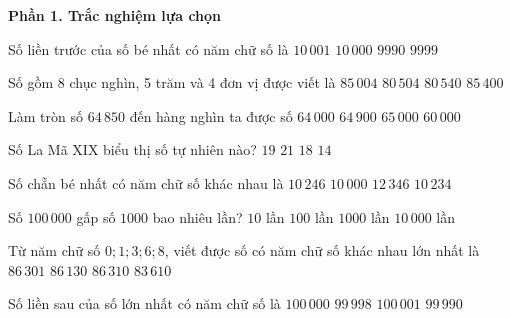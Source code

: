 \textbf{Phần 1. Trắc nghiệm lựa chọn}

\begin{ex} %
Số liền trước của số bé nhất có năm chữ số là
\choice
{$10\,001$}
{$10\,000$}
{$9990$}
{\True $9999$}
\end{ex}

\begin{ex} %
Số gồm 8 chục nghìn, 5 trăm và 4 đơn vị được viết là
\choice
{$85\,004$}
{\True $80\,504$}
{$80\,540$}
{$85\,400$}
\end{ex}

\begin{ex} %
Làm tròn số $64\,850$ đến hàng nghìn ta được số
\choice
{$64\,000$}
{$64\,900$}
{\True $65\,000$}
{$60\,000$}
\end{ex}

\begin{ex} %
Số La Mã $\text{XIX}$ biểu thị số tự nhiên nào?
\choice
{\True $19$}
{$21$}
{$18$}
{$14$}
\end{ex}

\begin{ex} %
Số chẵn bé nhất có năm chữ số khác nhau là
\choice
{$10\,246$}
{$10\,000$}
{$12\,346$}
{\True $10\,234$}
\end{ex}

\begin{ex} %
Số $100\,000$ gấp số $1000$ bao nhiêu lần?
\choice
{$10$ lần}
{\True $100$ lần}
{$1000$ lần}
{$10\,000$ lần}
\end{ex}

\begin{ex} %
Từ năm chữ số $0; 1; 3; 6; 8$, viết được số có năm chữ số khác nhau lớn nhất là
\choice
{$86\,301$}
{$86\,130$}
{\True $86\,310$}
{$83\,610$}
\end{ex}

\begin{ex} %
Số liền sau của số lớn nhất có năm chữ số là
\choice
{\True $100\,000$}
{$99\,998$}
{$100\,001$}
{$99\,990$}
\end{ex}

